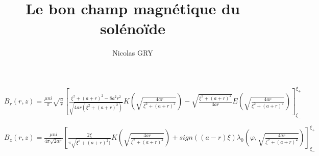 \documentclass{article}
\author{Nicolas GRY}
\title{Le bon champ magnétique du solénoïde}
\begin{document}
\maketitle
$B_r(r,z) = \frac{\mu n i}{\pi} \sqrt{\frac{a}{r}} \left[\frac{\xi^2 +(a+r)^2 - 8a^2r^2}{\sqrt{4ar(\xi^2 +(a+r)^2)}}K\left(\sqrt{\frac{4ar}{\xi^2 +(a+r)^2}}\right)- \sqrt{\frac{\xi^2 +(a+r)^2}{4ar}}E\left(\sqrt{\frac{4ar}{\xi^2 +(a+r)^2}}\right)\right]_{\xi_-}^{\xi_+}$

$B_z(r,z) = \frac{\mu n i}{4 \pi \sqrt{2ar}}\left[\frac{2\xi}{\pi\sqrt{\xi^2 +(a+r)^2)}}K\left(\sqrt{\frac{4ar}{\xi^2 +(a+r)^2}}\right) + sign((a-r)\xi)\lambda_0(\varphi,\sqrt{\frac{4ar}{\xi^2 +(a+r)^2}})\right]_{\xi_-}^{\xi_+}$
\end{document}
